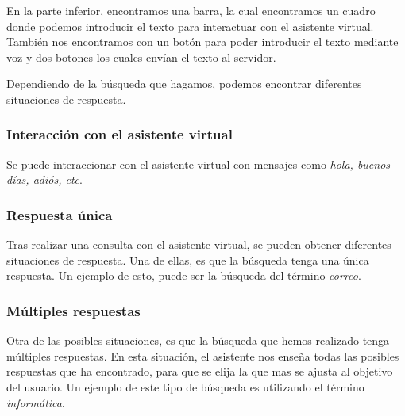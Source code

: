 
En la parte inferior, encontramos una barra, la cual encontramos un cuadro donde podemos introducir el texto para interactuar con el asistente virtual. También nos encontramos con un botón para poder introducir el texto mediante voz y dos botones los cuales envían el texto al servidor.


Dependiendo de la búsqueda que hagamos, podemos encontrar diferentes situaciones de respuesta.

\newpage

\subsubsection{Interacción con el asistente virtual}

Se puede interaccionar con el asistente virtual con mensajes como \textit{hola, buenos días, adiós, etc}.


\newpage

\subsubsection{Respuesta única}

Tras realizar una consulta con el asistente virtual, se pueden obtener diferentes situaciones de respuesta. Una de ellas, es que la búsqueda tenga una única respuesta. Un ejemplo de esto, puede ser la búsqueda del término \textit{correo}.


\newpage

\subsubsection{Múltiples respuestas}

Otra de las posibles situaciones, es que la búsqueda que hemos realizado tenga múltiples respuestas. En esta situación, el asistente nos enseña todas las posibles respuestas que ha encontrado, para que se elija la que mas se ajusta al objetivo del usuario. Un ejemplo de este tipo de búsqueda es utilizando el término \textit{informática}.


